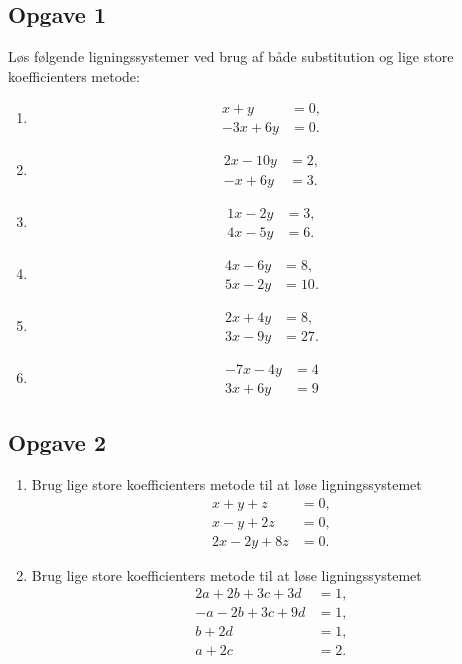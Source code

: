 \subsection*{Opgave 1}
Løs følgende ligningssystemer ved brug af både substitution og lige store koefficienters metode:
\begin{enumerate}[label=\roman*)]
\item \begin{align*}
x+y&=0,\\
-3x+6y&=0.
\end{align*}
\item 
\begin{align*}
2x-10y&=2,\\
-x+6y&=3.
\end{align*}
\item
\begin{align*}
1x-2y&=3,\\
4x-5y&=6.
\end{align*}
\item
\begin{align*}
4x-6y&=8,\\
5x-2y&=10.
\end{align*}
\item 
\begin{align*}
2x+4y&=8,\\
3x-9y&=27.
\end{align*}
\item 
\begin{align*}
	-7x -4y &= 4 \\
	3x + 6y &= 9
\end{align*}
\end{enumerate}

\subsection*{Opgave 2}
\begin{enumerate}[label=\roman*)]
	\item Brug lige store koefficienters metode til at løse ligningssystemet
	\begin{align*}
		x+y+z&=0,\\
		x-y+2z&=0,\\
		2x-2y+8z&=0.
	\end{align*}
	\item Brug lige store koefficienters metode til at løse ligningssystemet
	\begin{align*}
		2a + 2b + 3c + 3d &= 1,\\
		-a - 2b + 3c + 9d &= 1,\\
		b + 2d &= 1,\\
		a + 2c &= 2.
	\end{align*}
\end{enumerate}
